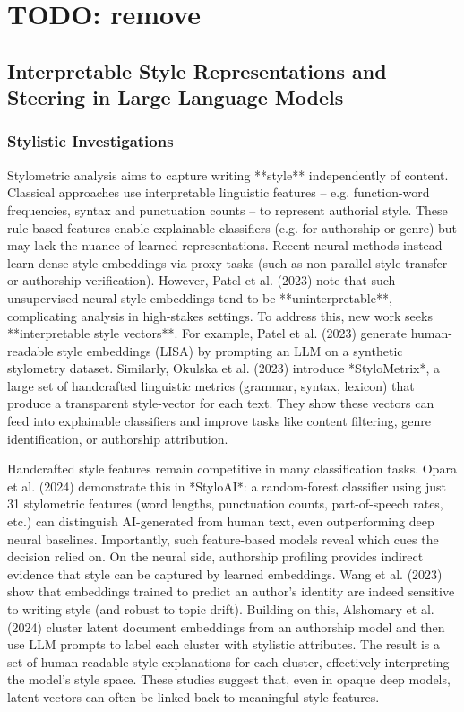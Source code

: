 
\section{TODO: remove}
\subsection*{Interpretable Style Representations and Steering in Large Language Models}

\subsubsection{Stylistic Investigations}

Stylometric analysis aims to capture writing **style** independently of content.  Classical approaches use interpretable linguistic features – e.g. function-word frequencies, syntax and punctuation counts – to represent authorial style. These rule-based features enable explainable classifiers (e.g. for authorship or genre) but may lack the nuance of learned representations.  Recent neural methods instead learn dense style embeddings via proxy tasks (such as non-parallel style transfer or authorship verification).  However, Patel et al. (2023) note that such unsupervised neural style embeddings tend to be **uninterpretable**, complicating analysis in high-stakes settings.  To address this, new work seeks **interpretable style vectors**. For example, Patel et al. (2023) generate human-readable style embeddings (LISA) by prompting an LLM on a synthetic stylometry dataset. Similarly, Okulska et al. (2023) introduce *StyloMetrix*, a large set of handcrafted linguistic metrics (grammar, syntax, lexicon) that produce a transparent style-vector for each text. They show these vectors can feed into explainable classifiers and improve tasks like content filtering, genre identification, or authorship attribution.

Handcrafted style features remain competitive in many classification tasks.  Opara et al. (2024) demonstrate this in *StyloAI*: a random-forest classifier using just 31 stylometric features (word lengths, punctuation counts, part-of-speech rates, etc.) can distinguish AI-generated from human text, even outperforming deep neural baselines.  Importantly, such feature-based models reveal which cues the decision relied on.  On the neural side, authorship profiling provides indirect evidence that style can be captured by learned embeddings. Wang et al. (2023) show that embeddings trained to predict an author’s identity are indeed sensitive to writing style (and robust to topic drift).  Building on this, Alshomary et al. (2024) cluster latent document embeddings from an authorship model and then use LLM prompts to label each cluster with stylistic attributes.  The result is a set of human-readable style explanations for each cluster, effectively interpreting the model’s style space.  These studies suggest that, even in opaque deep models, latent vectors can often be linked back to meaningful style features.

